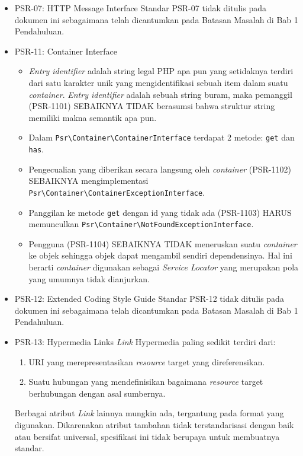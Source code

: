\documentclass[a4paper,twoside]{article}
\begin{document}
\begin{enumerate}
\begin{enumerate}
\begin{itemize}
				\item PSR-07: HTTP Message Interface
				Standar PSR-07 tidak ditulis pada dokumen ini sebagaimana telah dicantumkan pada Batasan Masalah di Bab 1 Pendahuluan.
				
				\item PSR-11: Container Interface
				\begin{itemize}
					\item \textit{Entry identifier} adalah string legal PHP apa pun yang setidaknya terdiri dari satu karakter unik yang mengidentifikasi sebuah item dalam suatu \textit{container}. \textit{Entry identifier} adalah sebuah string buram, maka pemanggil (PSR-1101) SEBAIKNYA TIDAK berasumsi bahwa struktur string memiliki makna semantik apa pun.
					\item Dalam \verb|Psr\Container\ContainerInterface| terdapat 2 metode: \verb|get| dan \verb|has|.
					\item Pengecualian yang diberikan secara langsung oleh \textit{container} (PSR-1102) SEBAIKNYA mengimplementasi \verb|Psr\Container\ContainerExceptionInterface|.
					\item Panggilan ke metode \verb|get| dengan id yang tidak ada (PSR-1103) HARUS memunculkan \verb|Psr\Container\NotFoundExceptionInterface|.
					\item Pengguna (PSR-1104) SEBAIKNYA TIDAK meneruskan suatu \textit{container} ke objek sehingga objek dapat mengambil sendiri dependensinya. Hal ini berarti \textit{container} digunakan sebagai \textit{Service Locator} yang merupakan pola yang umumnya tidak dianjurkan.
				\end{itemize}
				
				\item PSR-12: Extended Coding Style Guide
				Standar PSR-12 tidak ditulis pada dokumen ini sebagaimana telah dicantumkan pada Batasan Masalah di Bab 1 Pendahuluan.
				
				
				\item PSR-13: Hypermedia Links
				\textit{Link} Hypermedia paling sedikit terdiri dari:
				\begin{enumerate}
					\item URI yang merepresentasikan \textit{resource} target yang direferensikan.
					\item Suatu hubungan yang mendefinisikan bagaimana \textit{resource} target berhubungan dengan asal sumbernya.
				\end{enumerate}
				
				Berbagai atribut \textit{Link} lainnya mungkin ada, tergantung pada format yang digunakan. Dikarenakan atribut tambahan tidak terstandarisasi dengan baik atau bersifat universal, spesifikasi ini tidak berupaya untuk membuatnya standar.
				

\end{itemize}
\end{enumerate}
\end{enumerate}
\end{document}
